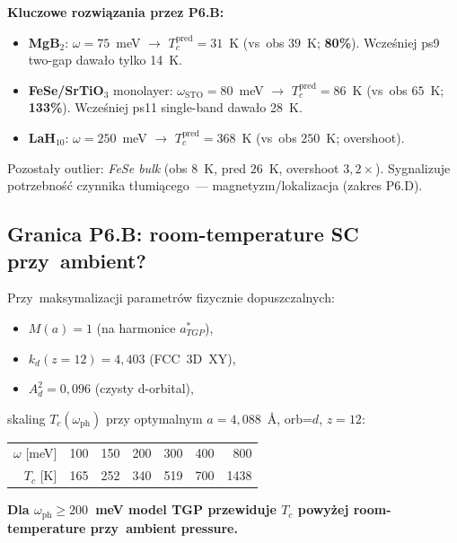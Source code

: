 \noindent \textbf{Kluczowe rozwi\k{a}zania przez P6.B:}
\begin{itemize}\itemsep0pt
  \item \textbf{MgB${}_2$}: $\omega=75$~meV $\to$ $T_c^\text{pred}=31$~K
    (vs~obs $39$~K; \textbf{80\%}). Wcze\'sniej ps9 two-gap dawa\l{}o tylko 14~K.
  \item \textbf{FeSe/SrTiO${}_3$} monolayer: $\omega_\text{STO}=80$~meV
    $\to$ $T_c^\text{pred}=86$~K (vs~obs $65$~K; \textbf{133\%}).
    Wcze\'sniej ps11 single-band dawa\l{}o 28~K.
  \item \textbf{LaH${}_{10}$}: $\omega=250$~meV $\to$ $T_c^\text{pred}=368$~K
    (vs~obs $250$~K; overshoot).
\end{itemize}

Pozosta\l{}y outlier: \emph{FeSe bulk} (obs $8$~K, pred $26$~K,
overshoot $3{,}2\times$). Sygnalizuje potrzebno\'s\'c czynnika
t\l{}umi\k{a}cego~--- magnetyzm/lokalizacja (zakres P6.D).

\subsection{Granica P6.B: room-temperature SC przy~ambient?}
\label{sec:roomtemp}

Przy~maksymalizacji parametr\'ow fizycznie dopuszczalnych:
\begin{itemize}\itemsep0pt
  \item $M(a)=1$ (na harmonice $a^*_{TGP}$),
  \item $k_d(z=12)=4{,}403$ (FCC~3D~XY),
  \item $A_d^2 = 0{,}096$ (czysty d-orbital),
\end{itemize}

\noindent skaling $T_c(\omega_\text{ph})$ przy optymalnym
$a=4{,}088$~\AA, orb=$d$, $z=12$:

\begin{center}
\begin{tabular}{rrrrrrr}
\toprule
$\omega$ [meV] & 100 & 150 & 200 & 300 & 400 & 800 \\
$T_c$ [K] & 165 & 252 & 340 & 519 & 700 & 1438 \\
\bottomrule
\end{tabular}
\end{center}

\noindent \textbf{Dla $\omega_\text{ph}\geq 200$~meV model TGP przewiduje
$T_c$ powy\.zej room-temperature przy~ambient pressure.}


